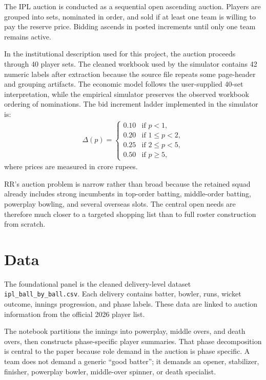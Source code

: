\documentclass[11pt]{article}
\begin{document}
The IPL auction is conducted as a sequential open ascending auction. Players are grouped into sets, nominated in order, and sold if at least one team is willing to pay the reserve price. Bidding ascends in posted increments until only one team remains active.

In the institutional description used for this project, the auction proceeds through 40 player sets. The cleaned workbook used by the simulator contains 42 numeric labels after extraction because the source file repeats some page-header and grouping artifacts. The economic model follows the user-supplied 40-set interpretation, while the empirical simulator preserves the observed workbook ordering of nominations. The bid increment ladder implemented in the simulator is:
\begin{align}
\Delta(p)=
\begin{cases}
0.10 & \text{if } p<1,\\
0.20 & \text{if } 1\leq p<2,\\
0.25 & \text{if } 2\leq p<5,\\
0.50 & \text{if } p\geq 5,
\end{cases}
\end{align}
where prices are measured in crore rupees.

RR's auction problem is narrow rather than broad because the retained squad already includes strong incumbents in top-order batting, middle-order batting, powerplay bowling, and several overseas slots. The central open needs are therefore much closer to a targeted shopping list than to full roster construction from scratch.

\section{Data}

The foundational panel is the cleaned delivery-level dataset \texttt{ipl\_ball\_by\_ball.csv}. Each delivery contains batter, bowler, runs, wicket outcome, innings progression, and phase labels. These data are linked to auction information from the official 2026 player list.



The notebook partitions the innings into powerplay, middle overs, and death overs, then constructs phase-specific player summaries. That phase decomposition is central to the paper because role demand in the auction is phase specific. A team does not demand a generic ``good batter''; it demands an opener, stabilizer, finisher, powerplay bowler, middle-over spinner, or death specialist.
\end{document}

